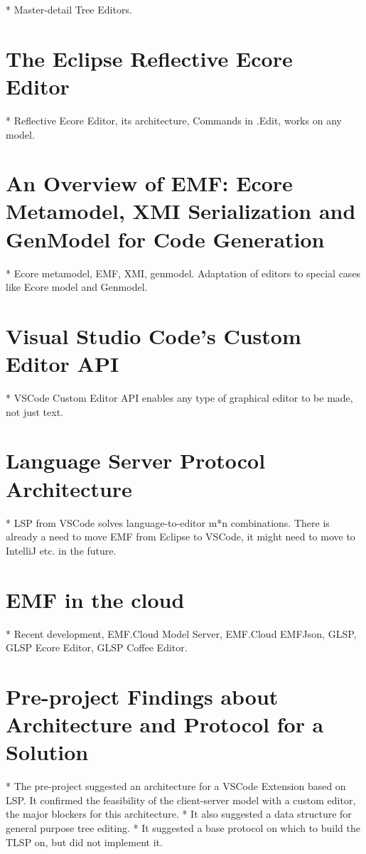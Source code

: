 * Master-detail Tree Editors. 

\section{The Eclipse Reflective Ecore Editor}

* Reflective Ecore Editor, its architecture, Commands in .Edit, works on any model.

\section{An Overview of EMF: Ecore Metamodel, XMI Serialization and GenModel for Code Generation}

* Ecore metamodel, EMF, XMI, genmodel. Adaptation of editors to special cases like Ecore model and Genmodel.

\section{Visual Studio Code's Custom Editor API}

* VSCode Custom Editor API enables any type of graphical editor to be made, not just text.

\section{Language Server Protocol Architecture}

* LSP from VSCode solves language-to-editor m*n combinations. There is already a need to move EMF from Eclipse to VSCode, it might need to move to IntelliJ etc. in the future.

\section{\acrlong{EMF} in the \Gls{cloud}}

* Recent development, EMF.Cloud Model Server, EMF.Cloud EMFJson, GLSP, GLSP Ecore Editor, GLSP Coffee Editor.

\section{Pre-project Findings about Architecture and Protocol for a Solution}

* The pre-project suggested an architecture for a VSCode Extension based on LSP. It confirmed the feasibility of the client-server model with a custom editor, the major blockers for this architecture.
  * It also suggested a data structure for general purpose tree editing.
  * It suggested a base protocol on which to build the TLSP on, but did not implement it.

